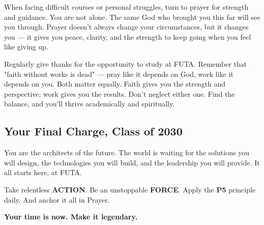 \documentclass[11pt,a4paper]{article}
\begin{document}
\begin{tcolorbox}[colback=lightGray,colframe=primary,title={\color{white}\textbf{Faith During Challenges}},colbacktitle=primary,arc=4pt,breakable]
When facing difficult courses or personal struggles, turn to prayer for strength and guidance. You are not alone. The same God who brought you this far will see you through. Prayer doesn't always change your circumstances, but it changes you --- it gives you peace, clarity, and the strength to keep going when you feel like giving up.
\end{tcolorbox}

\begin{tcolorbox}[colback=lightGray,colframe=primary,title={\color{white}\textbf{Gratitude \& Balance}},colbacktitle=primary,arc=4pt,breakable]
Regularly give thanks for the opportunity to study at FUTA. Remember that "faith without works is dead" --- pray like it depends on God, work like it depends on you. Both matter equally. Faith gives you the strength and perspective; work gives you the results. Don't neglect either one. Find the balance, and you'll thrive academically and spiritually.
\end{tcolorbox}

\subsection{Your Final Charge, Class of 2030}

You are the architects of the future. The world is waiting for the solutions you will design, the technologies you will build, and the leadership you will provide. It all starts here, at FUTA.

Take relentless \textbf{ACTION}. Be an unstoppable \textbf{FORCE}. Apply the \textbf{P5} principle daily. And anchor it all in Prayer.

\begin{center}
    {\Large\bfseries\color{primary} Your time is now. Make it legendary.}
\end{center}




\vspace{0.2cm}
\end{document}
